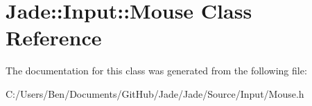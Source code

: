 \hypertarget{class_jade_1_1_input_1_1_mouse}{}\section{Jade\+:\+:Input\+:\+:Mouse Class Reference}
\label{class_jade_1_1_input_1_1_mouse}


The documentation for this class was generated from the following file\+:\begin{DoxyCompactItemize}
\item 
C\+:/\+Users/\+Ben/\+Documents/\+Git\+Hub/\+Jade/\+Jade/\+Source/\+Input/Mouse.\+h\end{DoxyCompactItemize}
